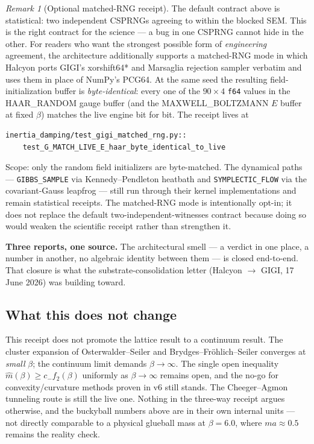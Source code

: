 \documentclass[12pt,a4paper]{article}
\theoremstyle{plain}
\theoremstyle{definition}
\theoremstyle{remark}
\newtheorem{remark}[theorem]{Remark}
\begin{document}
\begin{remark}[Optional matched-RNG receipt]
\label{rmk:matched-rng}
The default contract above is statistical: two independent CSPRNGs agreeing to within the blocked SEM. This is the right contract for the science --- a bug in one CSPRNG cannot hide in the other. For readers who want the strongest possible form of \emph{engineering} agreement, the architecture additionally supports a matched-RNG mode in which Halcyon ports GIGI's xorshift64* and Marsaglia rejection sampler verbatim and uses them in place of NumPy's PCG64. At the same seed the resulting field-initialization buffer is \emph{byte-identical}: every one of the $90 \times 4$ \texttt{f64} values in the HAAR\_RANDOM gauge buffer (and the MAXWELL\_BOLTZMANN $E$ buffer at fixed $\beta$) matches the live engine bit for bit. The receipt lives at
\begin{verbatim}
inertia_damping/test_gigi_matched_rng.py::
    test_G_MATCH_LIVE_E_haar_byte_identical_to_live
\end{verbatim}
Scope: only the random field initializers are byte-matched. The dynamical paths --- \texttt{GIBBS\_SAMPLE} via Kennedy--Pendleton heatbath and \texttt{SYMPLECTIC\_FLOW} via the covariant-Gauss leapfrog --- still run through their kernel implementations and remain statistical receipts. The matched-RNG mode is intentionally opt-in; it does not replace the default two-independent-witnesses contract because doing so would weaken the scientific receipt rather than strengthen it.
\end{remark}

\textbf{Three reports, one source.} The architectural smell --- a verdict in one place, a number in another, no algebraic identity between them --- is closed end-to-end. That closure is what the substrate-consolidation letter (Halcyon $\to$ GIGI, 17 June 2026) was building toward.

\subsection{What this does not change}

This receipt does not promote the lattice result to a continuum result. The cluster expansion of Osterwalder--Seiler and Brydges--Fr\"ohlich--Seiler converges at \emph{small} $\beta$; the continuum limit demands $\beta \to \infty$. The single open inequality $\hat m(\beta) \geq c_{-} f_{2}(\beta)$ uniformly as $\beta \to \infty$ remains open, and the no-go for convexity/curvature methods proven in v6 still stands. The Cheeger--Agmon tunneling route is still the live one. Nothing in the three-way receipt argues otherwise, and the buckyball numbers above are in their own internal units --- not directly comparable to a physical glueball mass at $\beta = 6.0$, where $ma \approx 0.5$ remains the reality check.
\end{document}

